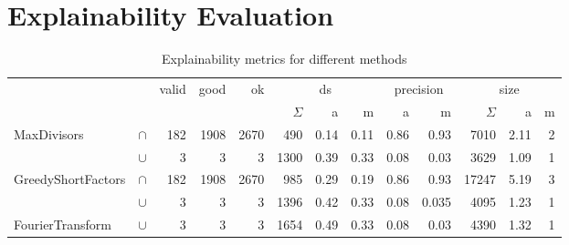 \newpage
\section{Explainability Evaluation}

\begin{table}[h]
	\begin{tabular}{ll||rrrrrr|rr|rrr}
		& & valid & good & ok &  \multicolumn{3}{c}{ds} & \multicolumn{2}{c}{precision} & \multicolumn{3}{c}{size}  \\
		& & & & & $\Sigma$ & a & m & a & m & $\Sigma$ & a & m\\
		\hline
		\hline
		\multirow{2}{*}{MaxDivisors} & $\cap$ & 182 & 1908 & 2670 & 490 & 0.14 & 0.11 &  0.86 & 0.93 & 7010 & 2.11 & 2 \\
		 & $\cup$ & 3 & 3 & 3 & 1300 & 0.39 & 0.33 & 0.08 & 0.03 & 3629 & 1.09 & 1 \\
		 \hline
		\multirow{2}{*}{GreedyShortFactors} & $\cap$ & 182 & 1908 & 2670 & 985 & 0.29 & 0.19 & 0.86 & 0.93 & 17247 & 5.19 & 3 \\
		& $\cup$ & 3 & 3 & 3 & 1396 & 0.42 & 0.33 & 0.08 & 0.035 & 4095 & 1.23 & 1 \\
		\hline
		FourierTransform & $\cup$ & 3 & 3 & 3 & 1654 & 0.49 & 0.33 & 0.08 & 0.03 & 4390 & 1.32 & 1 \\
	\end{tabular}
	\caption{Explainability metrics for different methods}
	\label{tab:eval-metric}
\end{table}

